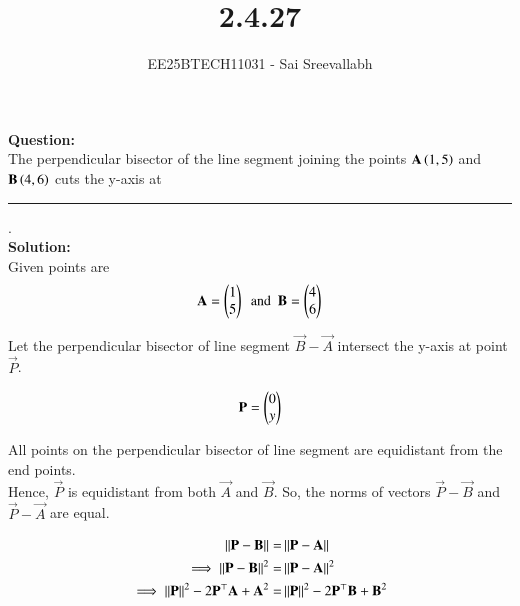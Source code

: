 \documentclass[journal]{IEEEtran}
\begin{document}

\vspace{3cm}

\title{2.4.27}
\author {EE25BTECH11031 - Sai Sreevallabh}
{\let\newpage\relax\maketitle}

\renewcommand{\thefigure}{\theenumi}
\renewcommand{\thetable}{\theenumi}
\setlength{\intextsep}{10pt} %


\renewcommand{\thetable}{\theenumi}

\textbf{Question: }\\

The perpendicular bisector of the line segment joining the points $\mathbf{A}\left(1,5\right)$ and $\mathbf{B}\left(4,6\right)$ cuts the y-axis at \rule{1.5cm}{0.4pt}.\\

\textbf{Solution: }\\

Given points are
\begin{align}
    \mathbf{A}= \begin{pmatrix}1\\5\end{pmatrix} \ \ \text{and}\ \ \mathbf{B} = \begin{pmatrix}4\\6\end{pmatrix}
\end{align}

Let the perpendicular bisector of line segment $\vec{B}-\vec{A}$ intersect the y-axis at point $\vec{P}$. 

\begin{align}
    \mathbf{P} = \begin{pmatrix}0\\y\end{pmatrix}
\end{align}

All points on the perpendicular bisector of line segment are equidistant from the end points. \\
Hence, $\vec{P}$ is equidistant from both $\vec{A}$ and $\vec{B}$. So, the norms of vectors $\vec{P}-\vec{B}$ and $\vec{P}-\vec{A}$ are equal. 

\begin{align}
    \left\lVert\mathbf{P}-\mathbf{B}\right\rVert =& \left\lVert\mathbf{P}-\mathbf{A}\right\rVert\\
    \implies  \left\lVert\mathbf{P}-\mathbf{B}\right\rVert^2 =& \left\lVert\mathbf{P}-\mathbf{A}\right\rVert^2\\
    \implies \left\lVert\mathbf{P}\right\rVert^2 - 2\mathbf{P}^\top\mathbf{A} + \mathbf{A}^2 =& \left\lVert\mathbf{P}\right\rVert^2 - 2\mathbf{P}^\top\mathbf{B} + \mathbf{B}^2
\end{align}
\end{document}
